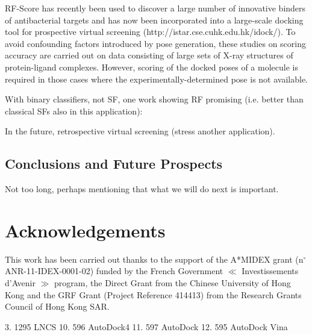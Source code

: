 \documentclass{llncs}
\begin{document}
RF-Score has recently been used \cite{1281} to discover a large number of innovative binders of antibacterial targets and has now been incorporated \cite{1362} into a large-scale docking tool for prospective virtual screening (http://istar.cse.cuhk.edu.hk/idock/). To avoid confounding factors introduced by pose generation, these studies on scoring accuracy are carried out on data consisting of large sets of X-ray structures of protein-ligand complexes. However, scoring of the docked poses of a molecule is required in those cases where the experimentally-determined pose is not available.

With binary classifiers, not SF, one work showing RF promising (i.e. better than classical SFs also in this application): \cite{1632}

In the future, retrospective virtual screening (stress another application).

\subsection{Conclusions and Future Prospects}

Not too long, perhaps mentioning that what we will do next is important.

\section{Acknowledgements}

This work has been carried out thanks to the support of the A*MIDEX grant (n$^\circ$ ANR-11-IDEX-0001-02) funded by the French Government $\ll$ Investissements d'Avenir $\gg$ program, the Direct Grant from the Chinese University of Hong Kong and the GRF Grant (Project Reference 414413) from the Research Grants Council of Hong Kong SAR.

3.	1295 LNCS
10.	596 AutoDock4
11.	597 AutoDock
12.	595 AutoDock Vina



\end{document}
